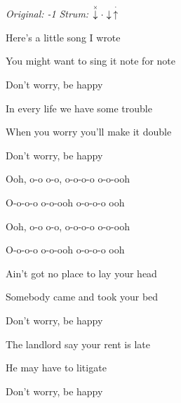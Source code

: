 \begin{song}


\begin{headerbox}
\RaiseBoxWithChucks
{} \quad
\textit{Original: -1} \quad
\textit{Strum:} $\ChuckDown\Miss\Down\StaccatoUp$ 
\end{headerbox}


\begin{strumbox}
\end{strumbox}

\bigskip

\Large

 Here's a little song I wrote \par
You might want to sing it note for note \par
Don't worry, be happy \par

\bigskip

 In every life we have some trouble \par
{} When you worry you'll make it double \par
Don't worry, be happy  \par

\bigskip

\begin{chorusboxwide}{\Chorus}
Ooh, o-o o-o, o-o-o-o o-o-ooh  \par
O-o-o-o o-o-ooh  o-o-o-o ooh  \par
{}Ooh, o-o o-o, o-o-o-o o-o-ooh  \par
O-o-o-o o-o-ooh  o-o-o-o ooh  \par
\end{chorusboxwide}

\bigskip

 Ain't got no place to lay your head \par
{} Somebody came and took your bed \par
Don't worry, be happy \par

\bigskip

The landlord say your rent is late \par
{} He may have to litigate \par
Don't worry, be happy \par


\end{song}
